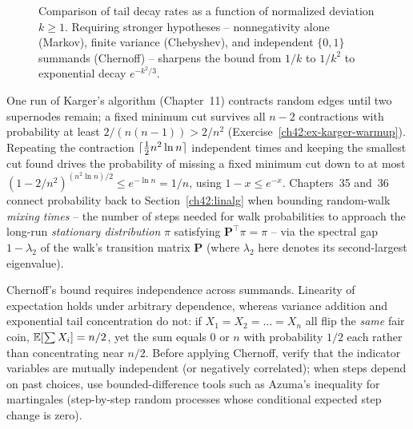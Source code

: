 \begin{figure}[htbp]
\centering
{}
\caption{Comparison of tail decay rates as a function of normalized deviation $k \ge 1$. Requiring stronger hypotheses -- nonnegativity alone (Markov), finite variance (Chebyshev), and independent $\{0,1\}$ summands (Chernoff) -- sharpens the bound from $1/k$ to $1/k^2$ to exponential decay $e^{-k^2/3}$.}
\label{ch42:fig-tail-bounds}
\end{figure}

\begin{applicationbox}
One run of Karger's algorithm (Chapter~11) contracts random edges until two supernodes remain; a fixed minimum cut survives all $n-2$ contractions with probability at least $2/(n(n-1)) > 2/n^2$ (Exercise~\ref{ch42:ex-karger-warmup}). Repeating the contraction $\lceil\tfrac{1}{2}n^2\ln n\rceil$ independent times and keeping the smallest cut found drives the probability of missing a fixed minimum cut down to at most $(1 - 2/n^2)^{(n^2\ln n)/2} \le e^{-\ln n} = 1/n$, using $1 - x \le e^{-x}$. Chapters~35 and~36 connect probability back to Section~\ref{ch42:linalg} when bounding random-walk \emph{mixing times} -- the number of steps needed for walk probabilities to approach the long-run \emph{stationary distribution} $\pi$ satisfying $\mathbf{P}^\top\pi = \pi$ -- via the spectral gap $1 - \lambda_2$ of the walk's transition matrix $\mathbf{P}$ (where $\lambda_2$ here denotes its second-largest eigenvalue).
\end{applicationbox}

\begin{trapbox}
Chernoff's bound requires independence across summands. Linearity of expectation holds under arbitrary dependence, whereas variance addition and exponential tail concentration do not: if $X_1 = X_2 = \dots = X_n$ all flip the \emph{same} fair coin, $\operatorname{\mathbb{E}}[\sum X_i] = n/2$, yet the sum equals $0$ or $n$ with probability $1/2$ each rather than concentrating near $n/2$. Before applying Chernoff, verify that the indicator variables are mutually independent (or negatively correlated); when steps depend on past choices, use bounded-difference tools such as Azuma's inequality for martingales (step-by-step random processes whose conditional expected step change is zero).
\end{trapbox}

